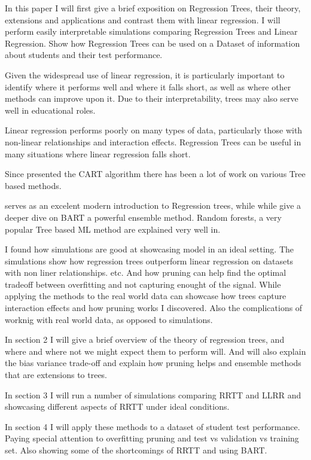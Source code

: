\documentclass[12pt]{article}
\begin{document}
In this paper I will first give a brief exposition on Regression Trees, their theory, extensions and applications and contrast them with linear regression. I will perform easily interpretable simulations comparing Regression Trees and Linear Regression. Show how Regression Trees can be used on a Dataset of information about students and their test performance.

Given the widespread use of linear regression, it is particularly important to identify where it performs well and where it falls short, as well as where other methods can improve upon it. Due to their interpretability, trees may also serve well in educational roles.

Linear regression performs poorly on many types of data, particularly those with non-linear relationships and interaction effects. Regression Trees can be useful in many situations where linear regression falls short.

Since \citep{breiman1984} presented the CART algorithm there has been a lot of work on various Tree based methods.

\citep{hastie2021} serves as an excelent modern introduction to Regression trees, while while \citep{tan2019} give a deeper dive on BART a powerful ensemble method.
Random forests, a very popular Tree based ML method are explained very well in\citep{biau2016}.



I found how simulations are good at showcasing model in an ideal setting. The simulations show how regression trees outperform linear regression on datasets with non liner relationships. etc. And how pruning can help find the optimal tradeoff between overfitting and not capturing enought of the signal. While applying the methods to the real world data can showcase how trees capture  interaction effects and how pruning works I discovered. Also the complications of worknig with real world data, as opposed to simulations.


In section 2 I will give a brief overview of the theory of regression trees, and where and where not we might expect them to perform will. And will also explain the bias variance trade-off and explain how pruning helps and ensemble methods that are extensions to trees.

In section 3 I will run a number of simulations comparing RRTT and LLRR and showcasing different aspects of RRTT under ideal conditions.

In section 4 I will apply these methods to a dataset of student test performance. Paying special attention to overfitting pruning and test vs validation vs training set. Also showing some of the shortcomings of RRTT and using BART.
\end{document}
